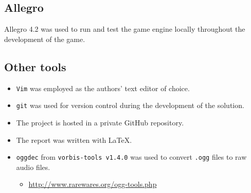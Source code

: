 \subsection{Allegro}
	Allegro 4.2 was used to run and test the game engine locally throughout the development of the game.

\subsection{Other tools}
	\begin{itemize}
		\item{\texttt{Vim} was employed as the authors' text editor of choice.}
		\item{\texttt{git} was used for version control during the development of the solution.}
		\item{The project is hosted in a private GitHub repository.}
		\item{The report was written with \LaTeX.}
		\item{\texttt{oggdec} from \texttt{vorbis-tools v1.4.0} was used to convert \texttt{.ogg} files to raw audio files.}
		\begin{itemize}
				\item{\url{http://www.rarewares.org/ogg-tools.php}}
		\end{itemize}
	\end{itemize}